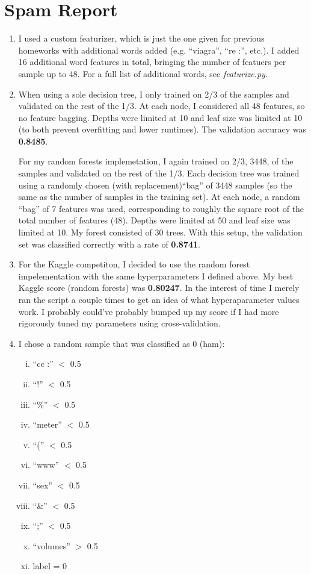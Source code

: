 \documentclass{article}
\begin{document}
\section*{Spam Report}
\begin{enumerate}
  \item I used a custom featurizer, which is just the one given for previous homeworks with additional words added (e.g. ``viagra'', ``re :'', etc.). I added 16 additional word features in total, bringing the number of featuers per sample up to 48. For a full list of additional words, see \textit{featurize.py}.
 
  \item When using a sole decision tree, I only trained on 2/3 of the samples and validated on the rest of the 1/3. At each node, I considered all 48 features, so no feature bagging. Depths were limited at 10 and leaf size was limited at 10 (to both prevent overfitting and lower runtimes). The validation accuracy was \textbf{0.8485}.

     For my random forests implemetation, I again trained on 2/3, 3448, of the samples and validated on the rest of the 1/3. Each decision tree was trained using a randomly chosen (with replacement)``bag'' of 3448 samples (so the same as the number of samples in the training set). At each node, a random ``bag'' of 7 features was used, corresponding to roughly the square root of the total number of features (48). Depths were limited at 50 and leaf size was limited at 10. My forest consisted of 30 trees. With this setup, the validation set was classified correctly with a rate of \textbf{0.8741}.

   \item For the Kaggle competiton, I decided to use the random forest impelementation with the same hyperparameters I defined above. My best Kaggle score (random forests) was \textbf{0.80247}. In the interest of time I merely ran the script a couple times to get an idea of what hyperaparameter values work. I probably could've probably bumped up my score if I had more rigorously tuned my parameters using cross-validation.

   \item I chose a random sample that was classified as 0 (ham):
     \begin{enumerate}[i.]
       \item ``cc :'' $<$ 0.5
       \item ``!'' $<$ 0.5
       \item ``\%'' $<$ 0.5
       \item ``meter'' $<$ 0.5
       \item ``('' $<$ 0.5
       \item ``www'' $<$ 0.5
       \item ``sex'' $<$ 0.5
       \item ``\&'' $<$ 0.5
       \item ``;'' $<$ 0.5
       \item ``volumes'' $>$ 0.5
       \item label = 0
     \end{enumerate}


\end{enumerate}
\end{document}
